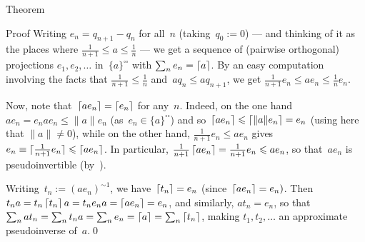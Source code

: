 \documentclass[a]{subfiles}
\begin{document}
\begin{parsec}
\begin{point}{Theorem}
\begin{point}{Proof}
Writing $e_{n}=q_{n+1}-q_n$
for all~$n$ (taking~$q_0:=0$)
--- and thinking of it as the places
where $\frac{1}{n+1}\leq a\leq \frac{1}{n}$ --- 
we get a sequence of (pairwise orthogonal) projections
$e_1,e_2,\dotsc$ in~$\{a\}^{\square\square}$
with $\sum_n e_n = \left\lceil a\right\rceil$.
By an easy computation
involving the facts that $\frac{1}{n+1}\leq \frac{1}{n}$
and~$aq_n\leq aq_{n+1}$,
we get $\frac{1}{n+1}e_n \leq ae_n \leq  \frac{1}{n}e_n$.

Now, note that~$\left\lceil ae_n\right\rceil=\left\lceil e_n\right\rceil$ for any~$n$.
Indeed, on the one hand~$ae_n=e_nae_n\leq \|a\|e_n$
(as~$e_n\in\{a\}^{\square\square}$)
and so~$\left\lceil ae_n\right\rceil\leqslant \left\lceil\|a\|e_n\right\rceil=e_n$
(using here that $\|a\|\neq 0$),
while on the other hand, $\frac{1}{n+1}e_n\leq ae_n$
gives $e_n\equiv \left\lceil\smash{\frac{1}{n+1}e_n}\right\rceil\leqslant \left\lceil ae_n\right\rceil$.
In particular, $\frac{1}{n+1}\left\lceil ae_n\right\rceil=\frac{1}{n+1}e_n \leqslant ae_n$,
so that~$ae_n$ is pseudoinvertible (by~).

Writing~$t_n := (ae_n)^{\sim1}$,
we have~$\left\lceil t_n\right\rceil=e_n$
(since~$\left\lceil ae_n\right\rceil=e_n)$.
Then $t_na=t_n\left\lceil t_n\right\rceil a=t_ne_na=\left\lceil ae_n\right\rceil=e_n$,
and similarly, $at_n = e_n$,
so that $\sum_n at_n = \sum_n t_n a 
=\sum_n e_n =\left\lceil a\right\rceil
= \sum_n \left\lceil t_n\right\rceil$,
making $t_1,t_2,\dotsc$ an approximate pseudoinverse of~$a$.\qed
\end{point}
\end{point}
\end{parsec}
\end{document}
